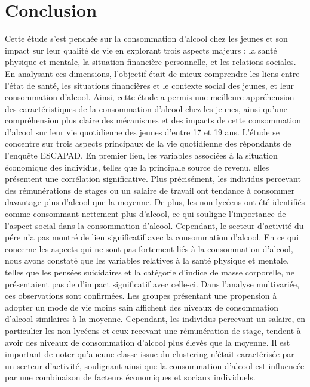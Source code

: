 \documentclass{article}
\begin{document}
\section{Conclusion}
Cette étude s'est penchée sur la consommation d'alcool chez les jeunes et son impact sur leur qualité de vie en explorant trois aspects majeurs : la santé physique et mentale, la situation financière personnelle, et les relations sociales. En analysant ces dimensions, l'objectif était de mieux comprendre les liens entre l'état de santé, les situations financières et le contexte social des jeunes, et leur consommation d'alcool.
Ainsi, cette étude a permis une meilleure appréhension des caractéristiques de la consommation d'alcool chez les jeunes, ainsi qu'une compréhension plus claire des mécanismes et des impacts de cette consommation d'alcool sur leur vie quotidienne des jeunes d'entre 17 et 19 ans.
L'étude se concentre sur trois aspects principaux de la vie quotidienne des répondants de l'enquête ESCAPAD. En premier lieu, les variables associées à la situation économique des individus, telles que la principale source de revenu, elles présentent une corrélation significative. Plus précisément, les individus percevant des rémunérations de stages ou un salaire de travail ont tendance à consommer davantage plus d'alcool que la moyenne.
De plus, les non-lycéens ont été identifiés comme consommant nettement plus d'alcool, ce qui souligne l'importance de l'aspect social dans la consommation d'alcool. Cependant, le secteur d'activité du pére n'a pas montré de lien significatif avec la consommation d'alcool.
En ce qui concerne les aspects qui ne sont pas fortement liés à la consommation d'alcool, nous avons constaté que les variables relatives à la santé physique et mentale, telles que les pensées suicidaires et la catégorie d'indice de masse corporelle, ne présentaient pas de d'impact significatif avec celle-ci.
Dans l'analyse multivariée, ces observations sont confirmées. Les groupes présentant une propension à adopter un mode de vie moins sain affichent des niveaux de consommation d'alcool similaires à la moyenne. Cependant, les individus percevant un salaire, en particulier les non-lycéens et ceux recevant une rémunération de stage, tendent à avoir des niveaux de consommation d'alcool plus élevés que la moyenne.
Il est important de noter qu'aucune classe issue du clustering n'était caractérisée par un secteur d'activité, soulignant ainsi que la consommation d'alcool est influencée par une combinaison de facteurs économiques et sociaux individuels.
 \\
\end{document}
